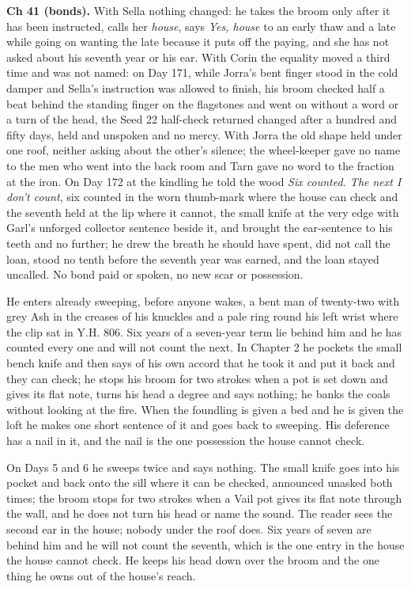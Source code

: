 \documentclass{design/chronicle}
\begin{document}
{\textbf{Ch 41 (bonds).} With Sella nothing changed: he takes the broom only after it has been instructed, calls her \emph{house}, says \emph{Yes, house} to an early thaw and a late while going on wanting the late because it puts off the paying, and she has not asked about his seventh year or his ear. With Corin the equality moved a third time and was not named: on Day 171, while Jorra’s bent finger stood in the cold damper and Sella’s instruction was allowed to finish, his broom checked half a beat behind the standing finger on the flagstones and went on without a word or a turn of the head, the Seed 22 half-check returned changed after a hundred and fifty days, held and unspoken and no mercy. With Jorra the old shape held under one roof, neither asking about the other’s silence; the wheel-keeper gave no name to the men who went into the back room and Tarn gave no word to the fraction at the iron. On Day 172 at the kindling he told the wood \emph{Six counted. The next I don’t count}, six counted in the worn thumb-mark where the house can check and the seventh held at the lip where it cannot, the small knife at the very edge with Garl’s unforged collector sentence beside it, and brought the ear-sentence to his teeth and no further; he drew the breath he should have spent, did not call the loan, stood no tenth before the seventh year was earned, and the loan stayed uncalled. No bond paid or spoken, no new scar or possession.

He enters already sweeping, before anyone wakes, a bent man of twenty-two with grey Ash in the creases of his knuckles and a pale ring round his left wrist where the clip sat in Y.H. 806. Six years of a seven-year term lie behind him and he has counted every one and will not count the next. In Chapter 2 he pockets the small bench knife and then says of his own accord that he took it and put it back and they can check; he stops his broom for two strokes when a pot is set down and gives its flat note, turns his head a degree and says nothing; he banks the coals without looking at the fire. When the foundling is given a bed and he is given the loft he makes one short sentence of it and goes back to sweeping. His deference has a nail in it, and the nail is the one possession the house cannot check.

On Days 5 and 6 he sweeps twice and says nothing. The small knife goes into his pocket and back onto the sill where it can be checked, announced unasked both times; the broom stops for two strokes when a Vail pot gives its flat note through the wall, and he does not turn his head or name the sound. The reader sees the second ear in the house; nobody under the roof does. Six years of seven are behind him and he will not count the seventh, which is the one entry in the house the house cannot check. He keeps his head down over the broom and the one thing he owns out of the house’s reach.

}
\end{document}
